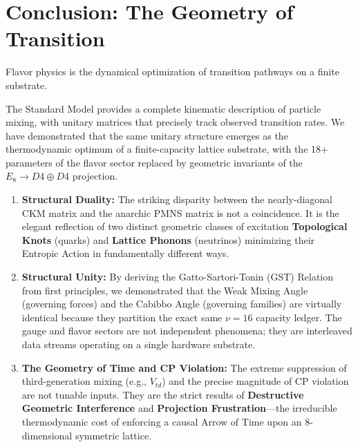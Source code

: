\section{Conclusion: The Geometry of Transition}
Flavor physics is the dynamical optimization of transition pathways on a finite substrate. 

The Standard Model provides a complete kinematic description of particle mixing, with unitary matrices that precisely track observed transition rates. We have demonstrated that the same unitary structure emerges as the thermodynamic optimum of a finite-capacity lattice substrate, with the 18+ parameters of the flavor sector replaced by geometric invariants of the $E_8 \to D4 \oplus D4$ projection.


\begin{enumerate}
    \item \textbf{Structural Duality:} The striking disparity between the nearly-diagonal CKM matrix and the anarchic PMNS matrix is not a coincidence. It is the elegant reflection of two distinct geometric classes of excitation \textbf{Topological Knots} (quarks) and \textbf{Lattice Phonons} (neutrinos) minimizing their Entropic Action in fundamentally different ways.
    
    \item \textbf{Structural Unity:} By deriving the Gatto-Sartori-Tonin (GST) Relation from first principles, we demonstrated that the Weak Mixing Angle (governing forces) and the Cabibbo Angle (governing families) are virtually identical because they partition the exact same $\nu=16$ capacity ledger. The gauge and flavor sectors are not independent phenomena; they are interleaved data streams operating on a single hardware substrate.
    
    \item \textbf{The Geometry of Time and CP Violation:} The extreme suppression of third-generation mixing (e.g., $V_{td}$) and the precise magnitude of CP violation are not tunable inputs. They are the strict results of \textbf{Destructive Geometric Interference} and \textbf{Projection Frustration}—the irreducible thermodynamic cost of enforcing a causal Arrow of Time upon an 8-dimensional symmetric lattice.
\end{enumerate}

